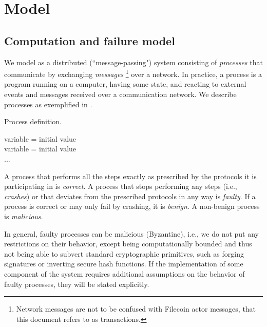 \section{Model}
\label{sec:model}

\subsection{Computation and failure model}

We model \nameAbbr as a distributed (``message-passing") system consisting of \emph{processes} that communicate by exchanging \emph{messages}%
\footnote{Network messages are not to be confused with Filecoin actor messages, that this document refers to as transactions.}
over a network. 
In practice, a process is a program running on a computer, having some state, and reacting to external events and messages received over a communication network.
We describe processes as exemplified in .

\begin{algorithm}[H]
\footnotesize
\caption{Process definition.}\label{alg:process-definition}
  \DontPrintSemicolon
  variable = initial value\\
  variable = initial value\\
  ...\\
\end{algorithm}

A process that performs all the steps exactly as prescribed by the protocols it is participating in is \emph{correct}.
A process that stops performing any steps (i.e., \emph{crashes}) or that deviates from the prescribed protocols in any way is \emph{faulty}.
If a process is correct or may only fail by crashing, it is \emph{benign}.
A non-benign process is \emph{malicious}.

In general, faulty processes can be malicious (Byzantine), i.e., we do not put any restrictions on their behavior, except being computationally bounded and thus not being able to subvert standard cryptographic primitives, such as forging signatures or inverting secure hash functions.
If the implementation of some component of the system requires additional assumptions on the behavior of faulty processes, they will be stated explicitly.

